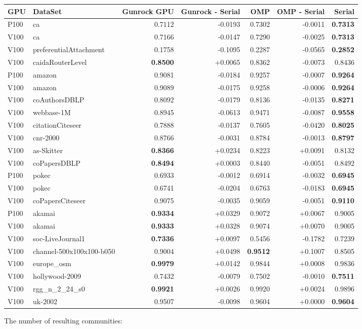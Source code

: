 \documentclass[10pt,oneside]{memoir}
\begin{document}
\begin{longtable}[]{@{}llrrrrr@{}}
\toprule
GPU & DataSet & Gunrock GPU & Gunrock - Serial & OMP & OMP - Serial &
Serial\tabularnewline
\midrule
\endhead
P100 & ca & 0.7112 & -0.0193 & 0.7302 & -0.0011 &
\textbf{0.7313}\tabularnewline
V100 & ca & 0.7166 & -0.0147 & 0.7290 & -0.0025 &
\textbf{0.7313}\tabularnewline
V100 & preferentialAttachment & 0.1758 & -0.1095 & 0.2287 & -0.0565 &
\textbf{0.2852}\tabularnewline
V100 & caidaRouterLevel & \textbf{0.8500} & +0.0065 & 0.8362 & -0.0073 &
0.8436\tabularnewline
P100 & amazon & 0.9081 & -0.0184 & 0.9257 & -0.0007 &
\textbf{0.9264}\tabularnewline
V100 & amazon & 0.9089 & -0.0175 & 0.9258 & -0.0006 &
\textbf{0.9264}\tabularnewline
V100 & coAuthorsDBLP & 0.8092 & -0.0179 & 0.8136 & -0.0135 &
\textbf{0.8271}\tabularnewline
V100 & webbase-1M & 0.8945 & -0.0613 & 0.9471 & -0.0087 &
\textbf{0.9558}\tabularnewline
V100 & citationCiteseer & 0.7888 & -0.0137 & 0.7605 & -0.0420 &
\textbf{0.8025}\tabularnewline
V100 & cnr-2000 & 0.8766 & -0.0031 & 0.8784 & -0.0013 &
\textbf{0.8797}\tabularnewline
V100 & as-Skitter & \textbf{0.8366} & +0.0234 & 0.8223 & +0.0091 &
0.8132\tabularnewline
V100 & coPapersDBLP & \textbf{0.8494} & +0.0003 & 0.8440 & -0.0051 &
0.8492\tabularnewline
P100 & pokec & 0.6933 & -0.0012 & 0.6914 & -0.0032 &
\textbf{0.6945}\tabularnewline
V100 & pokec & 0.6741 & -0.0204 & 0.6763 & -0.0183 &
\textbf{0.6945}\tabularnewline
V100 & coPapersCiteseer & 0.9075 & -0.0035 & 0.9059 & -0.0051 &
\textbf{0.9110}\tabularnewline
P100 & akamai & \textbf{0.9334} & +0.0329 & 0.9072 & +0.0067 &
0.9005\tabularnewline
V100 & akamai & \textbf{0.9333} & +0.0328 & 0.9074 & +0.0070 &
0.9005\tabularnewline
V100 & soc-LiveJournal1 & \textbf{0.7336} & +0.0097 & 0.5456 & -0.1782 &
0.7239\tabularnewline
V100 & channel-500x100x100-b050 & 0.9004 & +0.0498 & \textbf{0.9512} &
+0.1007 & 0.8505\tabularnewline
V100 & europe\_osm & \textbf{0.9979} & +0.0142 & 0.9844 & +0.0008 &
0.9836\tabularnewline
V100 & hollywood-2009 & 0.7432 & -0.0079 & 0.7502 & -0.0010 &
\textbf{0.7511}\tabularnewline
V100 & rgg\_n\_2\_24\_s0 & \textbf{0.9921} & +0.0026 & 0.9920 & +0.0024
& 0.9896\tabularnewline
V100 & uk-2002 & 0.9507 & -0.0098 & 0.9604 & +0.0000 &
\textbf{0.9604}\tabularnewline
\bottomrule
\end{longtable}

The number of resulting communities:
\end{document}
